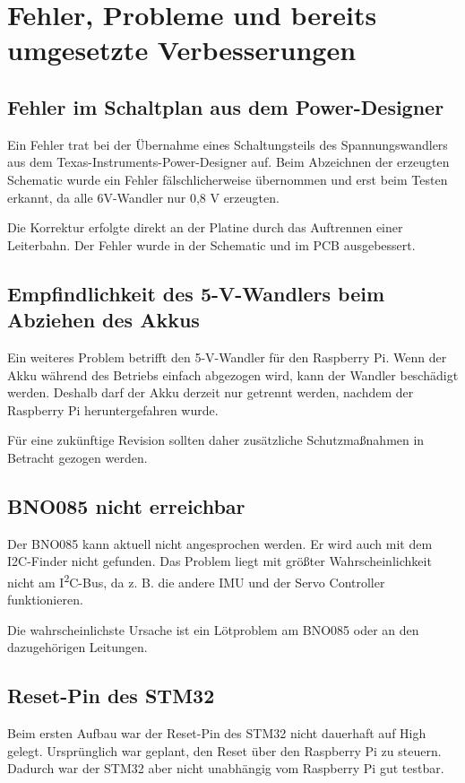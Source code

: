 \newpage

\section{Fehler, Probleme und bereits umgesetzte Verbesserungen}
\subsection{Fehler im Schaltplan aus dem Power-Designer}
Ein Fehler trat bei der Übernahme eines Schaltungsteils des Spannungswandlers aus dem Texas-Instruments-Power-Designer auf. Beim Abzeichnen der erzeugten Schematic wurde ein Fehler fälschlicherweise übernommen und erst beim Testen erkannt, da alle 6V-Wandler nur 0,8 V erzeugten.

Die Korrektur erfolgte direkt an der Platine durch das Auftrennen einer Leiterbahn. Der Fehler wurde in der Schematic und im PCB ausgebessert.

\subsection{Empfindlichkeit des 5-V-Wandlers beim Abziehen des Akkus}
Ein weiteres Problem betrifft den 5-V-Wandler für den Raspberry Pi. Wenn der Akku während des Betriebs einfach abgezogen wird, kann der Wandler beschädigt werden. Deshalb darf der Akku derzeit nur getrennt werden, nachdem der Raspberry Pi heruntergefahren wurde.

Für eine zukünftige Revision sollten daher zusätzliche Schutzmaßnahmen in Betracht gezogen werden.

\subsection{BNO085 nicht erreichbar}
Der BNO085 kann aktuell nicht angesprochen werden. Er wird auch mit dem I2C-Finder nicht gefunden. Das Problem liegt mit größter Wahrscheinlichkeit nicht am I\textsuperscript{2}C-Bus, da z. B. die andere IMU und der Servo Controller funktionieren.

Die wahrscheinlichste Ursache ist ein Lötproblem am BNO085 oder an den dazugehörigen Leitungen. 

\subsection{Reset-Pin des STM32}
Beim ersten Aufbau war der Reset-Pin des STM32 nicht dauerhaft auf High gelegt. Ursprünglich war geplant, den Reset über den Raspberry Pi zu steuern. Dadurch war der STM32 aber nicht unabhängig vom Raspberry Pi gut testbar.

